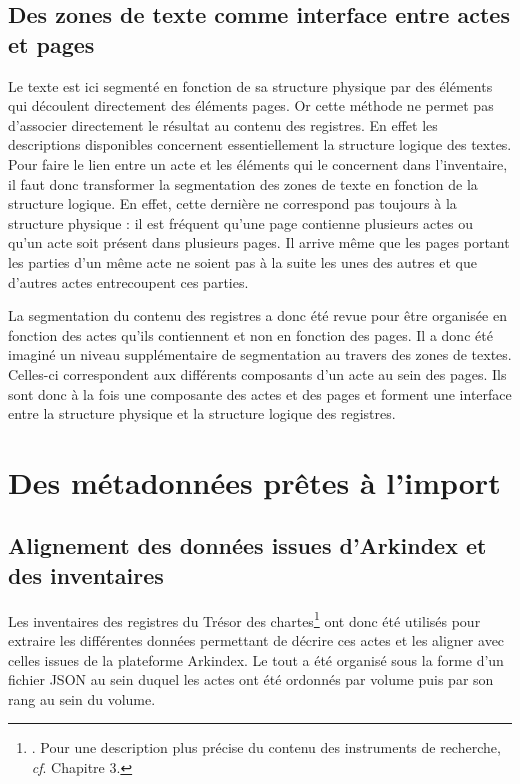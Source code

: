\documentclass[a4paper,12pt,twoside]{book}
\begin{document}
	
	\subsection{Des zones de texte comme interface entre actes et pages}
	
	Le texte est ici segmenté en fonction de sa structure physique par des éléments qui découlent directement des éléments pages. Or cette méthode ne permet pas d'associer directement le résultat au contenu des registres. En effet les descriptions disponibles concernent essentiellement la structure logique des textes. Pour faire le lien entre un acte et les éléments qui le concernent dans l'inventaire, il faut donc transformer la segmentation des zones de texte en fonction de la structure logique. En effet, cette dernière ne correspond pas toujours à la structure physique : il est fréquent qu'une page contienne plusieurs actes ou qu'un acte soit présent dans plusieurs pages. Il arrive même que les pages portant les parties d'un même acte ne soient pas à la suite les unes des autres et que d'autres actes entrecoupent ces parties.
	
	La segmentation du contenu des registres a donc été revue pour être organisée en fonction des actes qu'ils contiennent et non en fonction des pages. Il a donc été imaginé un niveau supplémentaire de segmentation au travers des zones de textes. Celles-ci correspondent aux différents composants d'un acte au sein des pages. Ils sont donc à la fois une composante des actes et des pages et forment une interface entre la structure physique et la structure logique des registres.
	
	\section{Des métadonnées prêtes à l’import}
	
	\subsection{Alignement des données issues d'Arkindex et des inventaires}
	
	Les inventaires des registres du Trésor des chartes\footnote{\cite{glenisson_registres_1958}. Pour une description plus précise du contenu des instruments de recherche, \textit{cf}. Chapitre 3.} ont donc été utilisés pour extraire les différentes données permettant de décrire ces actes et les aligner avec celles issues de la plateforme Arkindex. Le tout a été organisé sous la forme d'un fichier JSON au sein duquel les actes ont été ordonnés par volume puis par son rang au sein du volume.
	
\end{document}
